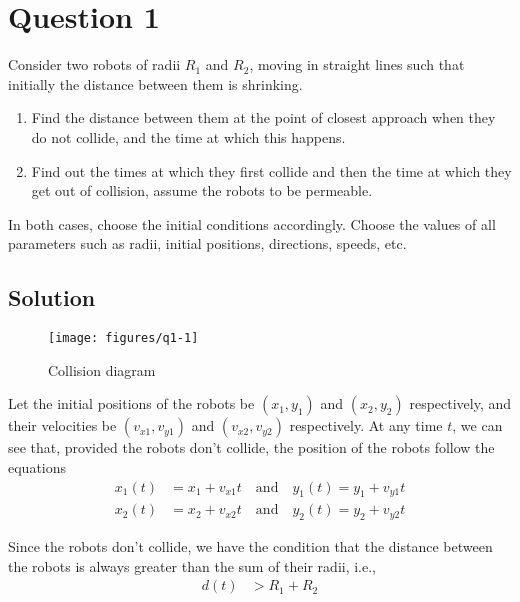 \section*{Question 1}

Consider two robots of radii \( R_1 \) and \( R_2 \), moving in straight lines such that initially the distance between them is shrinking.
\begin{enumerate}[label= (\alph*), noitemsep, topsep=0pt]
    \item Find the distance between them at the point of closest approach when they do not collide, and the time at which this happens.
    \item Find out the times at which they first collide and then the time at which they get out of collision, assume the robots to be permeable.
\end{enumerate}
In both cases, choose the initial conditions accordingly. Choose the values of all parameters such as radii, initial positions, directions, speeds, etc.

\vspace*{-1em}
\subsection*{Solution}

\vspace*{-3em}
\begin{figure}[htbp]
    \centering
    \texttt{[image: figures/q1-1]}
    \vspace*{-3em}
    \caption{
        Collision diagram
    }\label{fig:q1-1}
\end{figure}

Let the initial positions of the robots be \( (x_1, y_1) \) and \( (x_2, y_2) \) respectively, and their velocities be \( (v_{x1}, v_{y1}) \) and \( (v_{x2}, v_{y2}) \) respectively.
At any time \( t \), we can see that, provided the robots don't collide, the position of the robots follow the equations
\begin{align*}
    x_1(t) & = x_1 + v_{x1}t \quad \text{and} \quad y_1(t) = y_1 + v_{y1}t \\
    x_2(t) & = x_2 + v_{x2}t \quad \text{and} \quad y_2(t) = y_2 + v_{y2}t
\end{align*}

Since the robots don't collide, we have the condition that the distance between the robots is always greater than the sum of their radii, i.e.,
\begin{align*}
    d(t) & > R_1 + R_2
\end{align*}

